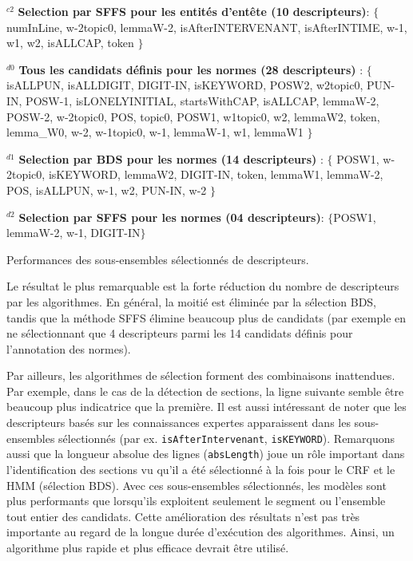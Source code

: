 \begin{table}[!htb]
$^{c2}$ \textbf{Selection par SFFS pour les  entités d'entête (10 descripteurs)}: $\lbrace$ numInLine, w-2topic0, lemmaW-2, isAfterINTERVENANT, isAfterINTIME, w-1, w1, w2, isALLCAP, token $\rbrace$ 

$^{d0}$ \textbf{Tous les candidats définis pour les normes (28 descripteurs)} : $\lbrace$ isALLPUN, isALLDIGIT, DIGIT-IN, isKEYWORD, POSW2, w2topic0, PUN-IN, POSW-1, isLONELYINITIAL, startsWithCAP, isALLCAP, lemmaW-2, POSW-2, w-2topic0, POS, topic0, POSW1, w1topic0, w2, lemmaW2, token, lemma\_W0, w-2, w-1topic0, w-1, lemmaW-1, w1, lemmaW1 $\rbrace$ 

$^{d1}$ \textbf{Selection par BDS pour les normes (14 descripteurs)} : $\lbrace$ POSW1, w-2topic0, isKEYWORD, lemmaW2, DIGIT-IN, token, lemmaW1, lemmaW-2, POS, isALLPUN, w-1, w2, PUN-IN, w-2 $\rbrace$ 

$^{d2}$ \textbf{Selection par SFFS pour les normes (04 descripteurs)}: $\lbrace$POSW1, lemmaW-2, w-1, DIGIT-IN$\rbrace$ 

\caption{Performances des sous-ensembles sélectionnés de descripteurs.}\label{fig:structuration:select-feats}
\end{table}

Le résultat le plus remarquable est la forte réduction du nombre de descripteurs par les algorithmes. En général, la moitié est éliminée par la sélection BDS, tandis que la méthode SFFS élimine beaucoup plus de candidats (par exemple en ne sélectionnant que 4 descripteurs parmi les 14 candidats définis pour l'annotation des normes).

Par ailleurs, les algorithmes de sélection forment des combinaisons inattendues. Par exemple, dans le cas de la détection de sections, la ligne suivante semble être beaucoup plus indicatrice que la première. Il est aussi intéressant de noter que les descripteurs basés sur les connaissances expertes apparaissent dans les sous-ensembles sélectionnés (par ex. \verb|isAfterIntervenant|, \verb|isKEYWORD|). Remarquons aussi que la longueur absolue des lignes (\verb|absLength|)  joue un rôle important dans l'identification des sections vu qu'il a été sélectionné à la fois pour le CRF et le HMM (sélection BDS). Avec ces sous-ensembles sélectionnés, les modèles sont plus performants que lorsqu'ils exploitent seulement le segment ou l'ensemble tout entier des candidats.  Cette amélioration des résultats n'est pas très importante au regard de la longue durée d'exécution des algorithmes. Ainsi, un algorithme plus rapide et plus efficace devrait être utilisé.


